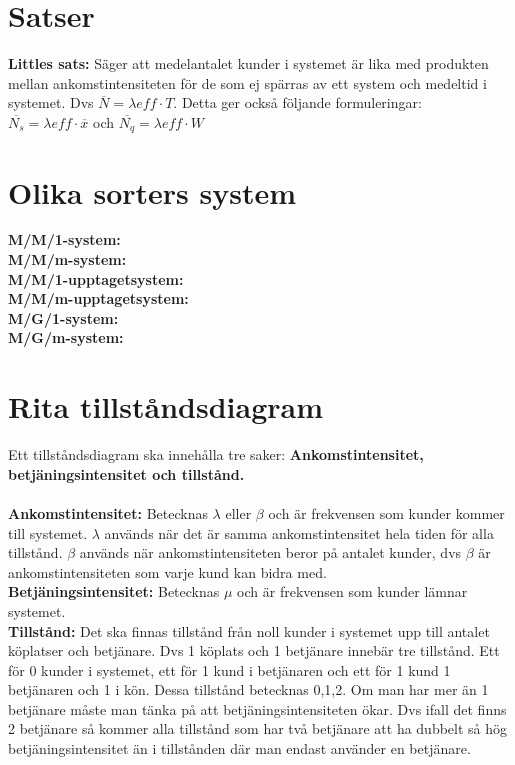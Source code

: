 \documentclass{article}
\begin{document}
	\section*{Satser}
	{ \bf Littles sats:} Säger att medelantalet kunder i systemet är lika med produkten mellan ankomstintensiteten för de som ej spärras av ett system och medeltid i systemet. Dvs $\overline{N}=\lambda{eff}\cdot T$. Detta ger också följande formuleringar:\\
	$\overline{N_s}=\lambda{eff}\cdot \overline{x}$ och $\overline{N_q}=\lambda{eff}\cdot W$
	\section*{Olika sorters system}
	{\bf M/M/1-system:}\\
	{\bf M/M/m-system:}\\
	{\bf M/M/1-upptagetsystem:}\\
	{\bf M/M/m-upptagetsystem:}\\
	{\bf M/G/1-system:}\\
	{\bf M/G/m-system:}\\	
 	\section*{Rita tillståndsdiagram}
	Ett tillståndsdiagram ska innehålla tre saker: {\bf Ankomstintensitet, betjäningsintensitet och tillstånd.}\\\\
	{\bf Ankomstintensitet:} Betecknas $\lambda$ eller $\beta$ och är frekvensen som kunder kommer till systemet. $\lambda$ används när det är samma ankomstintensitet hela tiden för alla tillstånd. $\beta$ används när ankomstintensiteten beror på antalet kunder, dvs $\beta$ är ankomstintensiteten som varje kund kan bidra med.\\
	{\bf Betjäningsintensitet:} Betecknas $\mu$ och är frekvensen som kunder lämnar systemet.\\
	{\bf Tillstånd:} Det ska finnas tillstånd från noll kunder i systemet upp till antalet köplatser och betjänare. Dvs 1 köplats och 1 betjänare innebär tre tillstånd. Ett för 0 kunder i systemet, ett för 1 kund i betjänaren och ett för 1 kund 1 betjänaren och 1 i kön. Dessa tillstånd betecknas 0,1,2. Om man har mer än 1 betjänare måste man tänka på att betjäningsintensiteten ökar. Dvs ifall det finns 2 betjänare så kommer alla tillstånd som har två betjänare att ha dubbelt så hög betjäningsintensitet än i tillstånden där man endast använder en betjänare. \\
\end{document}
